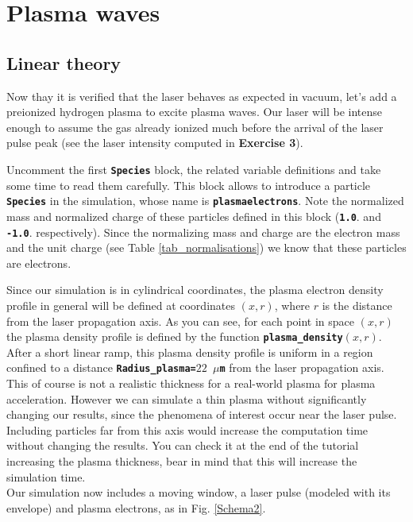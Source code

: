 \documentclass{article}
\newcommand{\commandline}[1]{\texttt{\textbf{#1}}}
\begin{document}
\newpage

\section{Plasma waves}

\subsection {Linear theory}
Now thay it is verified that the laser behaves as expected in vacuum, let's add a preionized hydrogen plasma to excite plasma waves.
Our laser will be intense enough to assume the gas already ionized much before the arrival of the laser pulse peak (see the laser intensity computed in \textbf{Exercise 3}).

Uncomment the first \commandline{Species} block, the related variable definitions and take some time to read them carefully. This block allows to introduce a particle \commandline{Species} in the simulation, whose name is \commandline{plasmaelectrons}. Note the normalized mass and normalized charge of these particles defined in this block (\commandline{1.0}. and \commandline{-1.0}. respectively). Since the normalizing mass and charge are the electron mass and the unit charge (see Table \ref{tab_normalisations}) we know that these particles are electrons.

Since our simulation is in cylindrical coordinates, the plasma electron density profile in general will be defined at coordinates $(x,r)$, where $r$ is the distance from the laser propagation axis. As you can see, for each point in space $(x,r)$ the plasma density profile is defined by the function \commandline{plasma\_density$(x,r)$}. After a short linear ramp, this plasma density profile is uniform in a region confined to a distance \commandline{Radius\_plasma=$22$ $\mu$m} from the laser propagation axis. This of course is not a realistic thickness for a real-world plasma for plasma acceleration. However we can simulate a thin plasma without significantly changing our results, since the phenomena of interest occur near the laser pulse. Including particles far from this axis would increase the computation time without changing the results. You can check it at the end of the tutorial increasing the plasma thickness, bear in mind that this will increase the  simulation time.\\

Our simulation now includes a moving window, a laser pulse (modeled with its envelope) and plasma electrons, as in Fig. \ref{Schema2}.
\end{document}
